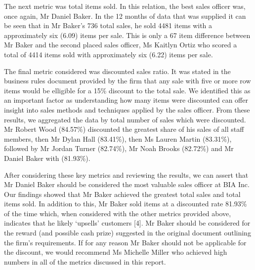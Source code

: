 \documentclass{article}
\begin{document}
    \noindent The next metric was total items sold. In this relation, the best sales officer was,
    once again, Mr Daniel Baker. In the 12 months of data that was 
    supplied it can be seen that in Mr Baker’s 736 total sales, he 
    sold 4481 items with a approximately six (6.09) items per sale. This is only a 67 item
    difference between Mr Baker and the second placed sales officer, Ms Kaitlyn Ortiz who
    scored a total of 4414 items sold with approximately six (6.22) items per sale. 
    \vspace{5mm}
    \par\noindent

    \noindent The final metric considered was discounted sales ratio. It was stated in the
    business rules document provided by the firm that any sale with five or more row items
    would be elligible for a 15\% discount to the total sale. We identified this as an
    important factor as understanding how many items were discounted can offer
    insight into sales methods and techniques applied by the sales officer. From these
    results, we aggregated the data by total number of sales which were discounted.
    Mr Robert Wood (84.57\%) discounted the greatest share of his sales of all staff
    members, then Mr Dylan Hall (83.41\%), then Ms Lauren Martin
    (83.31\%), followed by Mr Jordan Turner (82.74\%), Mr Noah Brooks (82.72\%) and Mr
    Daniel Baker with (81.93\%).
    \vspace{5mm}
    \par

    \noindent After considering these key metrics and reviewing the results, we can assert that 
    Mr Daniel Baker should be considered the most valuable sales officer at BIA Inc. Our findings showed
    that Mr Baker achieved the greatest total sales and total items sold.  In addition to this,
    Mr Baker sold items at a discounted rate 81.93\% of the time which, when considered with the
    other metrics provided above, indicates that he likely `upsells' customers [4]. 
    Mr Baker should be considered for the reward (and possible
    cash prize) suggested in the original document outlining the firm's requirements.
    If for any reason Mr Baker should not be applicable for the discount, we would recommend 
    Ms Michelle Miller who achieved high numbers in all of the metrics discussed in this report. 
\end{document}
